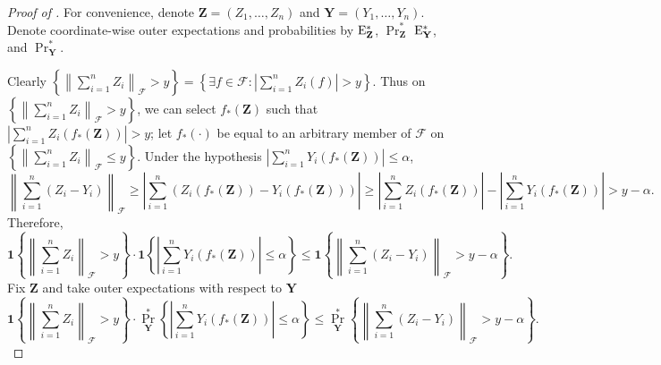 \begin{proof}[Proof of ]
For convenience, denote \(\mathbf{Z} = \left( Z_{1}, \dots, Z_{n} \right)\)
and \(\mathbf{Y} = \left( Y_{1}, \dots, Y_{n} \right)\).
Denote coordinate-wise outer expectations and probabilities by
\(\mathrm{E}_{\mathbf{Z}}^{\ast}\), \(\Pr_{\mathbf{Z}}^{\ast}\)
\(\mathrm{E}_{\mathbf{Y}}^{\ast}\), and \(\Pr_{\mathbf{Y}}^{\ast}\).

Clearly \(\left\{ \left\| \sum_{i = 1}^{n} Z_{i} \right\|_{\mathcal{F}} > y
\right\} = \left\{ \exists f \in \mathcal{F} : \left| \sum_{i = 1}^{n} Z_{i} (f)
\right| > y \right\}\).
Thus on \(\left\{ \left\| \sum_{i = 1}^{n} Z_{i} \right\|_{\mathcal{F}} > y
\right\}\), we can select \(f_{\ast} (\mathbf{Z})\) such that \(\left| \sum_{i =
1}^{n} Z_{i} \left( f_{\ast} (\mathbf{Z}) \right) \right| > y\);
let
\(f_{\ast} (\cdot)\) be equal to an arbitrary member of \(\mathcal{F}\) on
\(\left\{ \left\| \sum_{i = 1}^{n} Z_{i} \right\|_{\mathcal{F}} \leq y
\right\}\).
Under the hypothesis
\(\left| \sum_{i = 1}^{n} Y_{i} \left( f_{\ast} (\mathbf{Z}) \right) \right|
\leq \alpha\),
\begin{equation*}
  \left\| \sum_{i = 1}^{n} \left( Z_{i} - Y_{i} \right) \right\|_{\mathcal{F}}
  \geq
  \left| \sum_{i = 1}^{n} \left( Z_{i} \left( f_{\ast} (\mathbf{Z}) \right) -
  Y_{i} \left( f_{\ast} (\mathbf{Z}) \right) \right) \right| \geq
  \left| \sum_{i = 1}^{n} Z_{i} \left( f_{\ast} (\mathbf{Z}) \right) \right|
  - \left| \sum_{i = 1}^{n} Y_{i} \left( f_{\ast} (\mathbf{Z}) \right) \right| >
  y - \alpha.
\end{equation*}
Therefore,
\begin{equation*}
  \mathbf{1} \left\{ \left\| \sum_{i = 1}^{n} Z_{i} \right\|_{\mathcal{F}} > y
  \right\} \cdot \mathbf{1} \left\{ \left| \sum_{i = 1}^{n} Y_{i} \left(
  f_{\ast} (\mathbf{Z}) \right) \right| \leq \alpha \right\} \leq
  \mathbf{1} \left\{ \left\| \sum_{i = 1}^{n} \left( Z_{i} - Y_{i} \right)
  \right\|_{\mathcal{F}} > y - \alpha \right\}.
\end{equation*}
Fix \(\mathbf{Z}\) and take outer expectations with respect to
\(\mathbf{Y}\)
\begin{equation}
  \mathbf{1} \left\{ \left\| \sum_{i = 1}^{n} Z_{i} \right\|_{\mathcal{F}} > y
  \right\} \cdot \Pr_{\mathbf{Y}}^{\ast} \left\{ \left| \sum_{i = 1}^{n} Y_{i}
  \left( f_{\ast} (\mathbf{Z}) \right) \right| \leq \alpha \right\} \leq
  \Pr_{\mathbf{Y}}^{\ast} \left\{ \left\| \sum_{i = 1}^{n} \left( Z_{i} - Y_{i}
  \right) \right\|_{\mathcal{F}} > y - \alpha \right\}.
  \label{eqn--symm-1-1}

\end{equation}
\end{proof}
